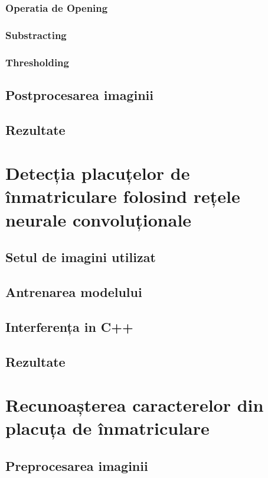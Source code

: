 \documentclass[12pt]{article}
\begin{document}
\subsubsection{Operatia de Opening}
\subsubsection{Substracting}
\subsubsection{Thresholding}

\subsection{Postprocesarea imaginii}

\subsection{Rezultate}

\newpage

\section{Detecția placuțelor de \^{i}nmatriculare folosind rețele neurale convoluționale}

\subsection{Setul de imagini utilizat}
\subsection{Antrenarea modelului}
\subsection{Interferența in C++}

\subsection{Rezultate}

\section{Recunoașterea caracterelor din placuța de \^{i}nmatriculare}

\subsection{Preprocesarea imaginii}
\end{document}
